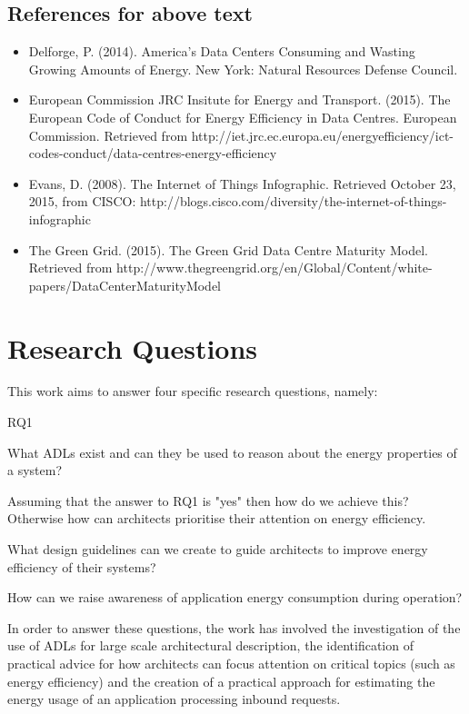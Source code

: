 \subsection{References for above text}
\begin{itemize}
	\item Delforge, P. (2014). America's Data Centers Consuming and Wasting Growing Amounts of Energy. New York: Natural Resources Defense Council.
    \item European Commission JRC Insitute for Energy and Transport. (2015). The European Code of Conduct for Energy Efficiency in Data Centres. European Commission. Retrieved from http://iet.jrc.ec.europa.eu/energyefficiency/ict-codes-conduct/data-centres-energy-efficiency
    \item Evans, D. (2008). The Internet of Things Infographic. Retrieved October 23, 2015, from CISCO: http://blogs.cisco.com/diversity/the-internet-of-things-infographic
    \item The Green Grid. (2015). The Green Grid Data Centre Maturity Model. Retrieved from http://www.thegreengrid.org/en/Global/Content/white-papers/DataCenterMaturityModel
\end{itemize}


\section{Research Questions}

This work aims to answer four specific research questions, namely:

\begin{labeling}{RQ1}
\item [RQ1] What ADLs exist and can they be used to reason about the energy properties of a system?
\item [RQ2] Assuming that the answer to RQ1 is "yes" then how do we achieve this?  Otherwise how can architects prioritise their attention on energy efficiency.
\item [RQ3] What design guidelines can we create to guide architects to improve energy efficiency of their systems?
\item [RQ4] How can we raise awareness of application energy consumption during operation?
\end{labeling}

In order to answer these questions, the work has involved the investigation of the use of ADLs for large scale architectural description, the identification of practical advice for how architects can focus attention on critical topics (such as energy efficiency) and the creation of a practical approach for estimating the energy usage of an application processing inbound requests.

